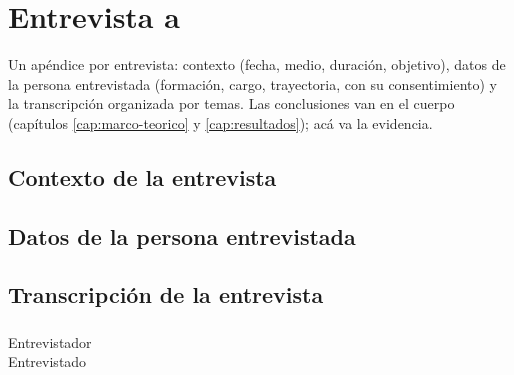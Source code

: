 
\chapter{Entrevista a }\label{apx:entrevista}

\begin{guia}
Un apéndice por entrevista: contexto (fecha, medio, duración, objetivo),
datos de la persona entrevistada (formación, cargo, trayectoria, con su
consentimiento) y la transcripción organizada por temas. Las
conclusiones van en el cuerpo (capítulos \ref{cap:marco-teorico} y
\ref{cap:resultados}); acá va la evidencia.
\end{guia}

\section{Contexto de la entrevista}


\section{Datos de la persona entrevistada}


\section{Transcripción de la entrevista}

\subsection{}

\begin{description}
    \item[Entrevistador] 
    \item[Entrevistado] 
\end{description}

\subsection{}

